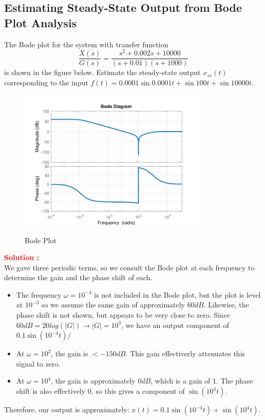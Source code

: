 \documentclass[12pt]{article}
\begin{document}
\clearpage
\subsection{Estimating Steady-State Output from Bode Plot Analysis}

The Bode plot for the system with transfer function
\begin{equation}
    \frac{X(s)}{G(s)} = \frac{s^2+0.002s+10000}{(s+0.01)(s+1000)}
\end{equation}
is shown in the figure below. Estimate the steady-state output \(x_{ss}(t)\) corresponding to the input \(f(t) = 0.0001\sin 0.0001t + \sin 100t + \sin 10000t\).
\begin{figure}[H]
    \centering
    \includegraphics[width=0.8\textwidth]{figs/6.10.png}
    \label{fig:99}
    \caption{Bode Plot}
\end{figure}
\textbf{\textcolor{red}{Solution :}} \\
We gave three periodic terms, so we consult the Bode plot at each frequency to determine the gain and the phase shift of each.
\begin{itemize}
    \item The frequency \(\omega = 10^{-4}\) is not included in the Bode plot, but the plot is level at \(10^{-3}\) so we assume the same gain of approximately \(60 dB\). Likewise, the phase shift is not shown, but appears to be very close to zero. Since \(60 dB = 20log(|G|) \rightarrow |G| = 10^3\), we have an output component of \(0.1 \sin(10^{-4}t)\)/
    \item At \(\omega = 10^2\), the gain is \(<-150 dB\). This gain effectiverly attenuates this signal to zero.
    \item At \(\omega = 10^4\), the gain is approximately \(0 dB\), which is a gain of \(1\). The phase shift is also effectively \(0\), so this gives a component of \(\sin(10^4t)\).
\end{itemize}
Therefore, our output is approximately: \(x(t) = 0.1 \sin(10^{-4}t) + \sin(10^4t)\).
\clearpage
\end{document}
